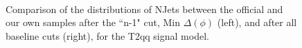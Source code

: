 \begin{figure}
        \centering
        \hspace{-1 cm}
        ~ %
        \caption{Comparison of the distributions of NJets between the official and our own samples after the ``n-1" cut, Min $\Delta(\phi)$ (left), and after all baseline cuts (right), for the T2qq signal model.}\label{fig:animals}
\end{figure}        
        
